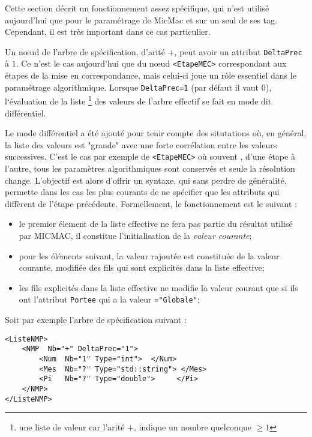 Cette section d\'ecrit un fonctionnement assez sp\'ecifique,
qui n'est utilis\'e aujourd'hui que pour le param\'etrage 
de MicMac et sur un seul de ses tag. Cependant, il est
tr\`es important dans ce cas particulier.

\label{DUG:Mode:Dif}

Un n\oe{}ud de l'arbre de sp\'ecification, d'arit\'e $+$,
peut avoir un attribut {\tt DeltaPrec} \`a $1$. Ce n'est le cas aujourd'hui
que du n\oe{}ud {\tt <EtapeMEC>} correspondant aux \'etapes de la
mise en correspondance, mais celui-ci joue un 
r\^ole essentiel dans le param\'etrage algorithmique.
Lorsque {\tt DeltaPrec=1} (par d\'efaut il vaut $0$), l`\'evaluation
de la liste  \footnote{une liste de valeur car l'arit\'e $+$, 
indique un nombre quelconque $\geq 1$}
des valeurs de l'arbre effectif se fait en mode dit diff\'erentiel.

Le mode diff\'erentiel a \'et\'e ajout\'e  pour tenir compte des situtations
o\`u, en g\'en\'eral, la liste des valeurs est "grande"
avec une forte corr\'elation entre les
valeurs successives. C'est le cas par exemple de 
{\tt <EtapeMEC>} o\`u souvent , d'une \'etape \`a l'autre,
tous les param\`etres algorithmiques sont conserv\'es et 
seule la r\'esolution change. L'objectif est alors d'offrir
un syntaxe, qui sans perdre de g\'en\'eralit\'e, permette dans
les cas les plus courants de ne sp\'ecifier que les attributs qui
diff\`erent de l'\'etape pr\'ec\'edente. Formellement, le fonctionnement
est le suivant :

\begin{itemize}
   \item le premier \'element de la liste effective ne fera pas partie
         du r\'esultat utilis\'e par MICMAC, il constitue l'initialisation
         de la \emph{valeur courante};
    \item pour les \'el\'ements suivant, la valeur rajout\'ee
          est constitu\'ee de la valeur courante, modifi\'ee des 
          fils qui sont explicit\'es dans la liste effective;
     \item les fils explicit\'es dans la liste effective ne
            modifie la valeur courant que si ils ont l'attribut
           {\tt Portee} qui a la valeur {\tt ="Globale"};
\end{itemize}

Soit par exemple l'arbre de sp\'ecification suivant :

\begin{verbatim}
<ListeNMP>
    <NMP  Nb="+" DeltaPrec="1">
        <Num  Nb="1" Type="int">  </Num>
        <Mes  Nb="?" Type="std::string"> </Mes>
        <Pi   Nb="?" Type="double">     </Pi>
    </NMP>
</ListeNMP>
\end{verbatim}

